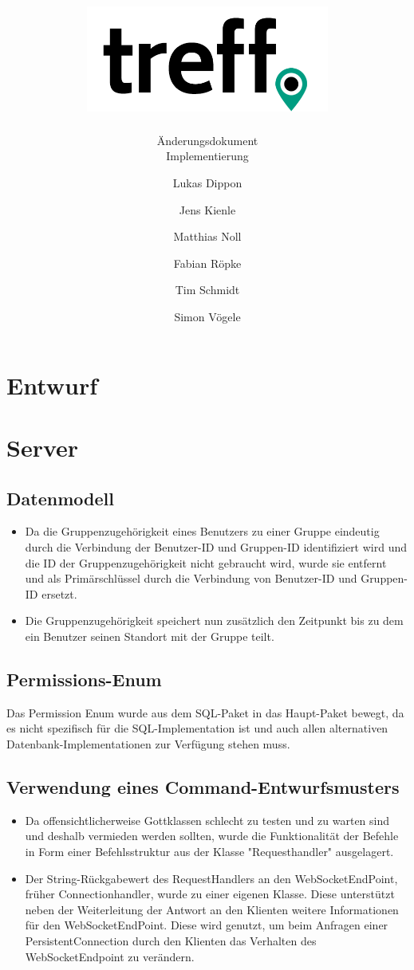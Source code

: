 \documentclass[parskip=full,11pt]{scrartcl}
\title{\includegraphics[width = 80mm]{images/logo_crop.png}}
\subtitle{\huge Änderungsdokument\\Implementierung}
\author{Lukas Dippon
        \and Jens Kienle
        \and Matthias Noll
        \and Fabian Röpke
        \and Tim Schmidt
        \and Simon Vögele}
\begin{document}
\maketitle
\thispagestyle{empty} %

\pagebreak
\tableofcontents

\pagebreak
\section{Entwurf}



\pagebreak
\section{Server}

\subsection{Datenmodell}
	\begin{itemize}
	\item Da die Gruppenzugehörigkeit eines Benutzers zu einer Gruppe eindeutig
		durch die Verbindung der Benutzer-ID und Gruppen-ID identifiziert wird
		und die ID der Gruppenzugehörigkeit nicht gebraucht wird, wurde sie
		entfernt und als Primärschlüssel durch die Verbindung von Benutzer-ID
		und Gruppen-ID ersetzt.
	\item Die Gruppenzugehörigkeit speichert nun zusätzlich den Zeitpunkt bis
		zu dem ein Benutzer seinen Standort mit der Gruppe teilt.
	\end{itemize}

\subsection{Permissions-Enum}
Das Permission Enum wurde aus dem SQL-Paket in das Haupt-Paket bewegt, da es
nicht spezifisch für die SQL-Implementation ist und auch allen alternativen
Datenbank-Implementationen zur Verfügung stehen muss.

\subsection{Verwendung eines Command-Entwurfsmusters}
	\begin{itemize}
	\item Da offensichtlicherweise Gottklassen schlecht zu testen und zu warten
		sind und deshalb vermieden werden sollten, wurde
		die Funktionalität der Befehle in Form einer Befehlsstruktur aus der
		Klasse "Requesthandler" ausgelagert.
	\item Der String-Rückgabewert des RequestHandlers an den WebSocketEndPoint,
		früher Connectionhandler, wurde zu einer eigenen Klasse.
		Diese unterstützt neben der Weiterleitung der Antwort an den Klienten
		weitere Informationen für den WebSocketEndPoint.
		Diese wird genutzt, um beim Anfragen einer PersistentConnection durch
		den Klienten das Verhalten des WebSocketEndpoint zu verändern.
	\end{itemize}
\end{document}
